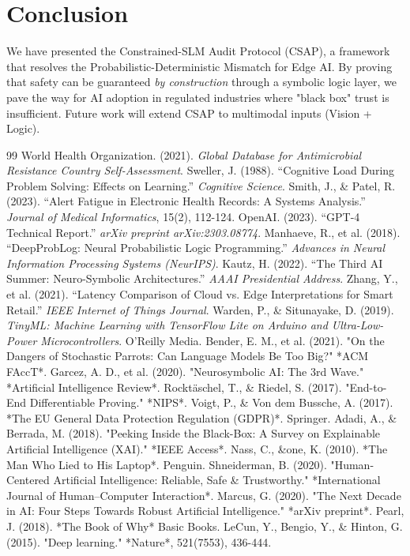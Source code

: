 \documentclass[11pt]{article}
\begin{document}
\section{Conclusion}

We have presented the Constrained-SLM Audit Protocol (CSAP), a framework that resolves the Probabilistic-Deterministic Mismatch for Edge AI. By proving that safety can be guaranteed \textit{by construction} through a symbolic logic layer, we pave the way for AI adoption in regulated industries where "black box" trust is insufficient. Future work will extend CSAP to multimodal inputs (Vision + Logic).


\begin{thebibliography}{99}
 World Health Organization. (2021). \textit{Global Database for Antimicrobial Resistance Country Self-Assessment}.
 Sweller, J. (1988). ``Cognitive Load During Problem Solving: Effects on Learning.'' \textit{Cognitive Science}.
 Smith, J., \& Patel, R. (2023). ``Alert Fatigue in Electronic Health Records: A Systems Analysis.'' \textit{Journal of Medical Informatics}, 15(2), 112-124.
 OpenAI. (2023). ``GPT-4 Technical Report.'' \textit{arXiv preprint arXiv:2303.08774}.
 Manhaeve, R., et al. (2018). ``DeepProbLog: Neural Probabilistic Logic Programming.'' \textit{Advances in Neural Information Processing Systems (NeurIPS)}.
 Kautz, H. (2022). ``The Third AI Summer: Neuro-Symbolic Architectures.'' \textit{AAAI Presidential Address}.
 Zhang, Y., et al. (2021). ``Latency Comparison of Cloud vs. Edge Interpretations for Smart Retail.'' \textit{IEEE Internet of Things Journal}.
 Warden, P., \& Situnayake, D. (2019). \textit{TinyML: Machine Learning with TensorFlow Lite on Arduino and Ultra-Low-Power Microcontrollers}. O'Reilly Media.
 Bender, E. M., et al. (2021). "On the Dangers of Stochastic Parrots: Can Language Models Be Too Big?" *ACM FAccT*.
 Garcez, A. D., et al. (2020). "Neurosymbolic AI: The 3rd Wave." *Artificial Intelligence Review*.
 Rocktäschel, T., \& Riedel, S. (2017). "End-to-End Differentiable Proving." *NIPS*.
 Voigt, P., \& Von dem Bussche, A. (2017). *The EU General Data Protection Regulation (GDPR)*. Springer.
 Adadi, A., \& Berrada, M. (2018). "Peeking Inside the Black-Box: A Survey on Explainable Artificial Intelligence (XAI)." *IEEE Access*.
 Nass, C., \&one, K. (2010). *The Man Who Lied to His Laptop*. Penguin.
 Shneiderman, B. (2020). "Human-Centered Artificial Intelligence: Reliable, Safe & Trustworthy." *International Journal of Human–Computer Interaction*.
 Marcus, G. (2020). "The Next Decade in AI: Four Steps Towards Robust Artificial Intelligence." *arXiv preprint*.
 Pearl, J. (2018). *The Book of Why* Basic Books.
 LeCun, Y., Bengio, Y., \& Hinton, G. (2015). "Deep learning." *Nature*, 521(7553), 436-444.
\end{thebibliography}
\end{document}
